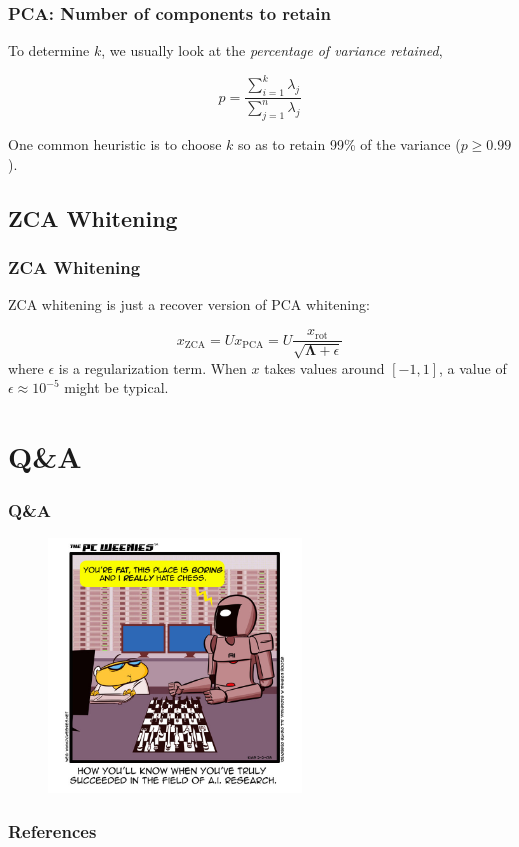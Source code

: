 \documentclass{beamer}
\begin{document}
\begin{frame}
  \frametitle{PCA: Number of components to retain}

  To determine $k$, we usually look at the \emph{percentage of variance retained},

  \begin{equation}
    p=\frac{\sum_{i=1}^{k}\lambda_{j}}{\sum_{j=1}^{n}\lambda_{j}}
  \end{equation}

  One common heuristic is to choose $k$ so as to retain 99\% of the variance ($p\geq 0.99$).
\end{frame}

\subsection{ZCA Whitening}

\begin{frame}
    \frametitle{ZCA Whitening}

    ZCA whitening is just a recover version of PCA whitening:

    \begin{equation*}
      x_{\text{ZCA}}=Ux_{\text{PCA}}=U\frac{x_{\text{rot}}}{\sqrt{\bm{\Lambda}+\epsilon}}
    \end{equation*}
    where $\epsilon$ is a regularization term. When $x$ takes values around $[-1, 1]$, a value of $\epsilon\approx 10^{-5}$ might be typical.
\end{frame}

\section*{Q\&A}

\begin{frame}
  \frametitle{Q\&A}
  
  \begin{figure}
    \includegraphics[width=0.6\textwidth]{ai_jokes.jpg}
  \end{figure}
\end{frame}

\begin{frame}
  \frametitle{References}
  \footnotesize
  
  
\end{frame}
\end{document}
